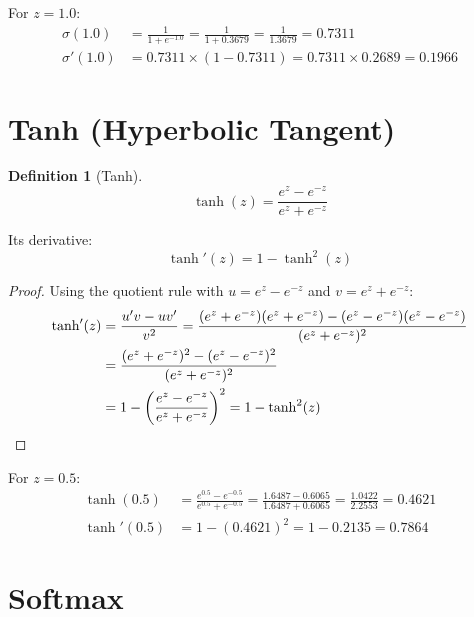 \documentclass[12pt, a4paper]{report}
\theoremstyle{definition}
\newtheorem{definition}{Definition}[chapter]
\begin{document}
\begin{numexample}
For $z = 1.0$:
\begin{align*}
    \sigma(1.0) &= \frac{1}{1 + e^{-1.0}} = \frac{1}{1 + 0.3679} = \frac{1}{1.3679} = \boxed{0.7311} \\[6pt]
    \sigma'(1.0) &= 0.7311 \times (1 - 0.7311) = 0.7311 \times 0.2689 = \boxed{0.1966}
\end{align*}
\end{numexample}

\section{Tanh (Hyperbolic Tangent)}

\begin{definition}[Tanh]
\begin{equation}
    \tanh(z) = \frac{e^z - e^{-z}}{e^z + e^{-z}}
\end{equation}

Its derivative:
\begin{equation}
    \tanh'(z) = 1 - \tanh^2(z)
\end{equation}
\end{definition}

\begin{proof}
Using the quotient rule with $u = e^z - e^{-z}$ and $v = e^z + e^{-z}$:
\begin{align*}
    \tanh'(z) &= \frac{u'v - uv'}{v^2} = \frac{(e^z+e^{-z})(e^z+e^{-z}) - (e^z-e^{-z})(e^z-e^{-z})}{(e^z+e^{-z})^2} \\
    &= \frac{(e^z+e^{-z})^2 - (e^z-e^{-z})^2}{(e^z+e^{-z})^2} \\
    &= 1 - \left(\frac{e^z - e^{-z}}{e^z + e^{-z}}\right)^2 = 1 - \tanh^2(z) \qedhere
\end{align*}
\end{proof}

\begin{numexample}
For $z = 0.5$:
\begin{align*}
    \tanh(0.5) &= \frac{e^{0.5} - e^{-0.5}}{e^{0.5} + e^{-0.5}} = \frac{1.6487 - 0.6065}{1.6487 + 0.6065} = \frac{1.0422}{2.2553} = \boxed{0.4621} \\[6pt]
    \tanh'(0.5) &= 1 - (0.4621)^2 = 1 - 0.2135 = \boxed{0.7864}
\end{align*}
\end{numexample}

\section{Softmax}
\end{document}
